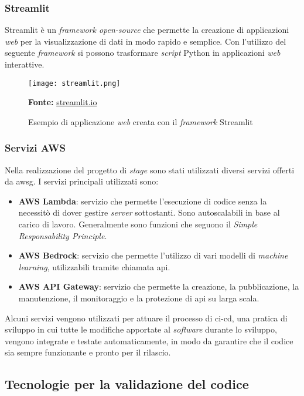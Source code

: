 \subsubsection{Streamlit}
Streamlit è un \textit{framework open-source} che permette la creazione di applicazioni \textit{web} per la visualizzazione di dati in modo rapido e semplice.
Con l'utilizzo del seguente \textit{framework} si possono trasformare \textit{script} Python in applicazioni \textit{web} interattive.
\begin{figure}[H]
    \centering
    \texttt{[image: streamlit.png]}
    \caption{Esempio di applicazione \textit{web} creata con il \textit{framework} Streamlit}
    \small \textbf{Fonte:} \href{https://streamlit.io}{streamlit.io}
    \label{fig:Streamlit}
\end{figure} 

\subsubsection {Servizi AWS}
Nella realizzazione del progetto di \textit{stage} sono stati utilizzati diversi servizi offerti da \gls{awsg}. I servizi principali utilizzati sono:
\begin{itemize}
    \item \textbf{AWS Lambda}: servizio che permette l'esecuzione di codice senza la necessitò di dover gestire \textit{server} sottostanti. Sono autoscalabili in base al carico di lavoro. Generalmente sono funzioni che seguono il \textit{Simple Responsability Principle}.
    \item \textbf{AWS Bedrock}: servizio che permette l'utilizzo di vari modelli di \textit{machine learning}, utilizzabili tramite chiamata \gls{api}.
    \item \textbf{AWS API Gateway}: servizio che permette la creazione, la pubblicazione, la manutenzione, il monitoraggio e la protezione di \gls{api} su larga scala.
\end{itemize}
Alcuni servizi vengono utilizzati per attuare il processo di \gls{ci-cd}, una pratica di sviluppo in cui tutte le modifiche apportate al \textit{software} durante lo sviluppo, vengono integrate e testate automaticamente, in modo da garantire che il codice sia sempre funzionante e pronto per il rilascio.
\subsection{Tecnologie per la validazione del codice}

